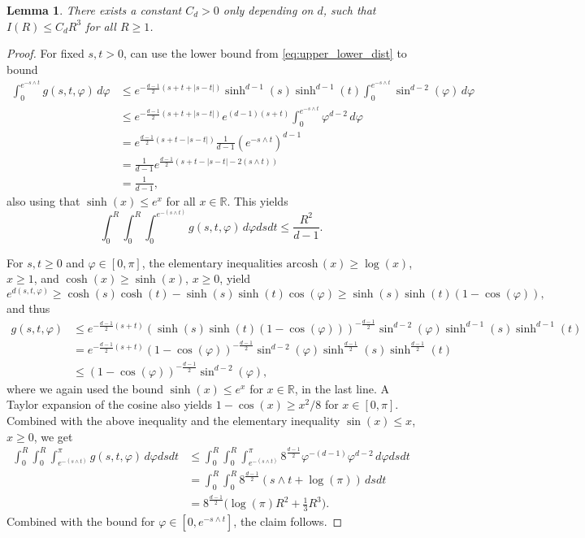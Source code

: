 \documentclass[11pt,a4paper]{article}
\theoremstyle{plain}
\newtheorem{lemma}[theorem]{Lemma}
\theoremstyle{definition}
\theoremstyle{remark}
\def\RR{\mathbb{R}}
\newcommand{\arcosh}{\mathrm{arcosh\,}}
\begin{document}
\begin{lemma}\label{lem:UpperBoundI}
    There exists a constant $C_d > 0$ only depending on $d$, such that $I(R) \leq C_d  R^3$ for all $R \geq 1$.
\end{lemma}
\begin{proof} 
    For fixed $s,t > 0$, can use the lower bound from \eqref{eq:upper_lower_dist} to bound
    \begin{align*}
        \int_0^{e^{-s \wedge t}} g(s,t,\varphi) \,d\varphi
        &\leq e^{-\frac{d-1}{2}(s+t+|s-t|)} \sinh^{d-1}(s) \sinh^{d-1}(t) \int_0^{e^{-s\wedge t}} \sin^{d-2}(\varphi) \,d \varphi\\
        &\leq e^{-\frac{d-1}{2}(s+t+|s-t|)} e^{(d-1)(s+t)} \int_0^{e^{-s\wedge t}} \varphi^{d-2} \, d \varphi\\
        &= e^{\frac{d-1}{2}(s+t-|s-t|)} \frac{1}{d-1} (e^{-s\wedge t})^{d-1}\\
        &= \frac{1}{d-1} e^{\frac{d-1}{2}(s+t-|s-t| - 2 (s\wedge t))}\\
        &= \frac{1}{d-1},
    \end{align*}
    also using that $\sinh(x)\leq e^x$ for all $x\in\RR$.
    This yields
    \begin{equation*}
        \int_0^R \int_0^R \int_0^{e^{-(s\wedge t)}} g(s,t,\varphi) \,d \varphi ds dt \leq \frac{R^2}{d-1}. 
    \end{equation*}

    
    For $s,t\geq 0$ and $\varphi \in [0,\pi]$, the elementary inequalities $\arcosh(x) \geq \log(x)$, $x \geq 1$, and $\cosh(x)\geq \sinh(x)$, $x\geq 0$, yield
    \[ e^{d(s,t,\varphi)} \geq \cosh(s)\cosh(t) - \sinh(s)\sinh(t)\cos(\varphi) \geq \sinh(s) \sinh(t) (1-\cos(\varphi)),   \]
    and thus
    \begin{align*}
    g(s,t,\varphi) 
    &\leq e^{-\frac{d-1}{2}(s+t)} \left(\sinh(s)\sinh(t) (1-\cos(\varphi))\right)^{-\frac{d-1}{2}} \sin^{d-2}(\varphi) \sinh^{d-1}(s)\sinh^{d-1}(t)\\
    &= e^{-\frac{d-1}{2}(s+t)} \left(1-\cos(\varphi)\right)^{-\frac{d-1}{2}} \sin^{d-2}(\varphi) \sinh^\frac{d-1}{2}(s)\sinh^\frac{d-1}{2}(t)\\
    &\leq \left(1-\cos(\varphi)\right)^{-\frac{d-1}{2}} \sin^{d-2}(\varphi),
    \end{align*}
    where we again used the bound $\sinh(x)\leq e^x$ for $x\in\RR$, in the last line.
    A Taylor expansion of the cosine also yields $1-\cos(x) \geq x^2/8$ for $x \in [0,\pi]$.
    Combined with the above inequality and the elementary inequality $\sin(x) \leq x$, $x \geq 0$, we get
    \begin{align*}
        \int_0^R \int_0^R \int_{e^{-(s\wedge t)}}^\pi g(s,t,\varphi) \, d\varphi ds dt
        &\leq \int_0^R \int_0^R \int_{e^{-(s\wedge t)}}^\pi 8^\frac{d-1}{2} \varphi^{-(d-1)} \varphi^{d-2} \, d\varphi ds dt\\
        &= \int_0^R \int_0^R  8^\frac{d-1}{2} (s\wedge t +\log(\pi)) \,ds dt\\
        &= 8^\frac{d-1}{2} \Big(\log(\pi) R^2 + \frac{1}{3}R^3\Big).
    \end{align*}
    Combined with the bound for $\varphi \in [0,e^{-s\wedge t}]$, the claim follows.
\end{proof}
\end{document}
